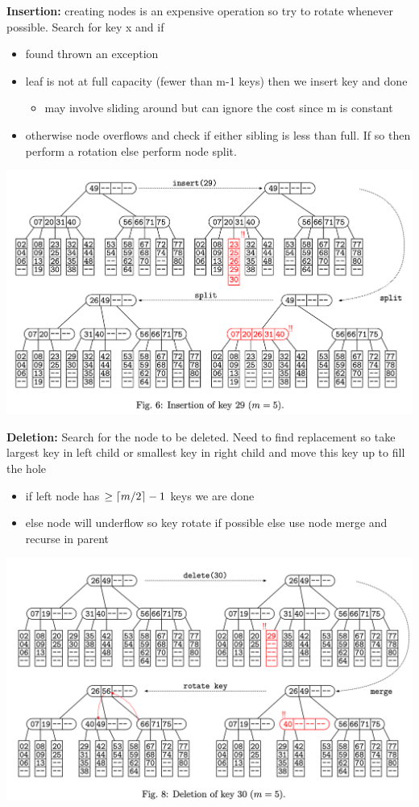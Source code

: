 \documentclass{article}
\DeclarePairedDelimiter{\ceil}{\lceil}{\rceil}
\begin{document}
  \textbf{Insertion: }creating nodes is an expensive operation so try to rotate whenever possible. Search for key x and if
  \begin{itemize}[noitemsep]
  \item found thrown an exception
  \item leaf is not at full capacity (fewer than m-1 keys) then we insert key and done
    \begin{itemize}[noitemsep]
      \item may involve sliding around but can ignore the cost since m is constant
    \end{itemize}
  \item otherwise node overflows and check if either sibling is less than full. If so then perform a rotation else perform node split. 
  \end{itemize}
  \begin{center}
  \includegraphics[scale=0.15]{BTreeInsertion}
  \end{center}
  \textbf{Deletion: }Search for the node to be deleted. Need to find replacement so take largest key in left child or smallest key in right child and move this key up to fill the hole
  \begin{itemize}[noitemsep]
  \item if left node has $\geq \ceil{m/2} - 1$ keys we are done
  \item else node will underflow so key rotate if possible else use node merge and recurse in parent
  \end{itemize}
  \begin{center}
  \includegraphics[scale=0.15]{BTreeDeletion}
  \end{center}
\end{document}
